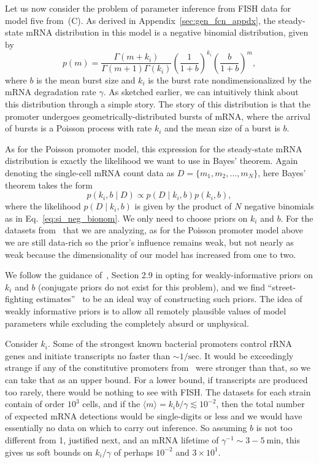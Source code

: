 Let us now consider the problem of parameter inference from FISH data for model
five from~(C). As derived in
Appendix~\ref{sec:gen_fcn_appdx}, the steady-state mRNA distribution in this
model is a negative binomial distribution, given by
\begin{equation}
p(m) = \frac{\Gamma(m+k_i)}{\Gamma(m+1)\Gamma(k_i)}
        \left(\frac{1}{1+b}\right)^{k_i}
        \left(\frac{b}{1+b}\right)^m,
\label{eq:si_neg_bionom}
\end{equation}
where $b$ is the mean burst size and $k_i$ is the burst rate nondimensionalized
by the mRNA degradation rate $\gamma$. As sketched earlier, we can intuitively
think about this distribution through a simple story. The story of this
distribution is that the promoter undergoes geometrically-distributed bursts of
mRNA, where the arrival of bursts is a Poisson process with rate $k_i$ and the
mean size of a burst is $b$.

As for the Poisson promoter model, this expression for the steady-state mRNA
distribution is exactly the likelihood we want to use in Bayes' theorem. Again
denoting the single-cell mRNA count data as $D=\{m_1, m_2,\dots, m_N\}$, here
Bayes' theorem takes the form
\begin{equation}
p(k_i, b \mid D) \propto p(D\mid k_i,b)p(k_i, b),
\end{equation}
where the likelihood $p(D\mid k_i,b)$ is given by the product of $N$ negative
binomials as in Eq.~\ref{eq:si_neg_bionom}. We only need to choose priors on
$k_i$ and $b$. For the datasets from~\cite{Jones2014} that we are analyzing, as
for the Poisson promoter model above we are still data-rich so the prior's
influence remains weak, but not nearly as weak because the dimensionality of our
model has increased from one to two.

We follow the guidance of~\cite{Gelman2013}, Section 2.9 in opting for
weakly-informative priors on $k_i$ and $b$ (conjugate priors do not exist for
this problem), and we find ``street-fighting estimates''~\cite{Mahajan2010} to
be an ideal way of constructing such priors. The idea of weakly informative
priors is to allow all remotely plausible values of model parameters while
excluding the completely absurd or unphysical.

Consider $k_i$. Some of the strongest known bacterial promoters control rRNA
genes and initiate transcripts no faster than $\sim 1/\text{sec}$. It would be
exceedingly strange if any of the constitutive promoters from~\cite{Jones2014}
were stronger than that, so we can take that as an upper bound. For a lower
bound, if transcripts are produced too rarely, there would be nothing to see
with FISH. The datasets for each strain contain of order $10^3$ cells, and if
the $\langle m \rangle = k_i b/\gamma \lesssim 10^{-2}$, then the total number
of expected mRNA detections would be single-digits or less and we would have
essentially no data on which to carry out inference. So assuming $b$ is not too
different from 1, justified next, and an mRNA lifetime of $\gamma^{-1}\sim
3-5~\text{min}$, this gives us soft bounds on $k_i/\gamma$ of perhaps $10^{-2}$
and $3\times 10^1$.

